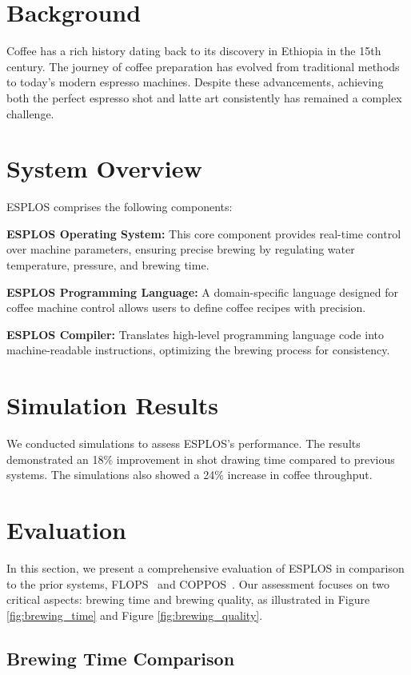 \documentclass[nonacm,sigplan]{acmart}
\begin{document}
\section{Background}
Coffee has a rich history dating back to its discovery in Ethiopia in the 15th century. The journey of coffee preparation has evolved from traditional methods to today's modern espresso machines. Despite these advancements, achieving both the perfect espresso shot and latte art consistently has remained a complex challenge.

\section{System Overview}
ESPLOS comprises the following components:

\textbf{ESPLOS Operating System:} This core component provides real-time control over machine parameters, ensuring precise brewing by regulating water temperature, pressure, and brewing time.

\textbf{ESPLOS Programming Language:} A domain-specific language designed for coffee machine control allows users to define coffee recipes with precision.

\textbf{ESPLOS Compiler:} Translates high-level programming language code into machine-readable instructions, optimizing the brewing process for consistency.

\section{Simulation Results}
We conducted simulations to assess ESPLOS's performance. The results demonstrated an 18\% improvement in shot drawing time compared to previous systems. The simulations also showed a 24\% increase in coffee throughput.

\section{Evaluation}

In this section, we present a comprehensive evaluation of ESPLOS in comparison to the prior systems, FLOPS~\cite{flops_osci} and COPPOS~\cite{coppos_cosp}. Our assessment focuses on two critical aspects: brewing time and brewing quality, as illustrated in Figure \ref{fig:brewing_time} and Figure \ref{fig:brewing_quality}.

\subsection{Brewing Time Comparison}
\end{document}
